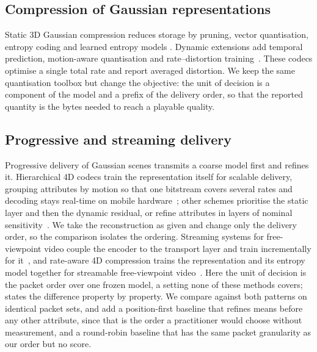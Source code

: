 \documentclass[lettersize,journal]{IEEEtran}
\begin{document}
\subsection{Compression of Gaussian representations}
Static 3D Gaussian compression reduces storage by pruning, vector quantisation,
entropy coding and learned entropy models
\cite{lee2024_compact3d,fan2024_lightgaussian,chen2024_hac}. Dynamic extensions
add temporal prediction, motion-aware quantisation and rate--distortion
training~\cite{lee2025_tsrd4dgs}. These codecs optimise a single total rate and
report averaged distortion. We keep the same quantisation toolbox but change the
objective: the unit of decision is a component of the model and a prefix of the
delivery order, so that the reported quantity is the bytes needed to reach a
playable quality.

\subsection{Progressive and streaming delivery}
Progressive delivery of Gaussian scenes transmits a coarse model first and
refines it. Hierarchical 4D codecs train the representation itself for scalable
delivery, grouping attributes by motion so that one bitstream covers several rates
and decoding stays real-time on mobile hardware~\cite{zheng2025_4dgcpro}; other
schemes prioritise the static layer and then the dynamic residual, or refine
attributes in layers of nominal sensitivity~\cite{lee2025_tsrd4dgs}. We take the
reconstruction as given and change only the delivery order, so the comparison
isolates the ordering. Streaming systems for free-viewpoint video couple the encoder to the transport
layer and train incrementally for it~\cite{wang2025_3dgcoding}, and rate-aware
4D compression trains the representation and its entropy model together for
streamable free-viewpoint video~\cite{hu2025_4dgc}. Here the unit of decision is
the packet order over one frozen model, a setting none of these methods covers;
 states the difference property by property. We compare against both
patterns on identical packet sets,
and add a position-first baseline that refines means before any other attribute,
since that is the order a practitioner would choose without measurement, and a
round-robin baseline that has the same packet granularity as our order but no
score.
\end{document}
